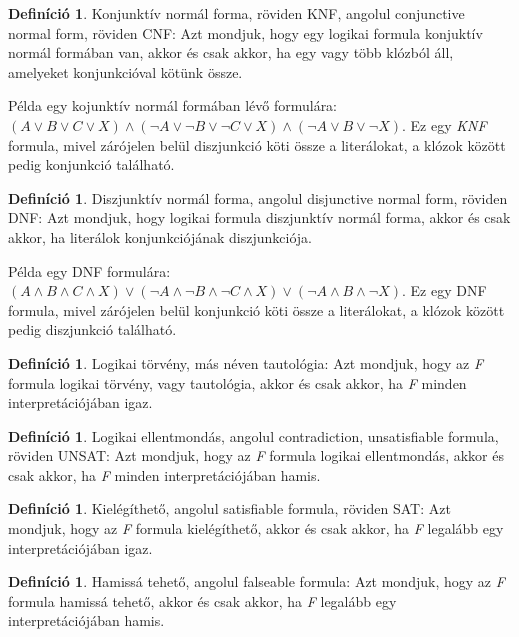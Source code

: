 \documentclass[
]{thesis-ekf}
\theoremstyle{definition}
\newtheorem{definicio}[tetel]{Definíció}
\theoremstyle{remark}
\begin{document}
\begin{definicio}\label{def-cnf}
	Konjunktív normál forma, röviden \textsc{KNF}, angolul conjunctive normal form, röviden \textsc{CNF}: Azt mondjuk, hogy egy logikai formula konjuktív normál formában van, akkor és csak akkor, ha egy vagy több klózból áll, amelyeket konjunkcióval kötünk össze.
\end{definicio}

	Példa egy kojunktív normál formában lévő formulára: $ (A \vee B \vee C \vee X) \wedge (\neg A \vee \neg B \vee \neg C \vee X) \wedge (\neg A \vee B \vee \neg X) $. Ez egy \emph{KNF} formula, mivel zárójelen belül diszjunkció köti össze a literálokat, a klózok között pedig konjunkció található.

\begin{definicio}\label{def-dnf}
	Diszjunktív normál forma, angolul disjunctive normal form, röviden \textsc{DNF}: Azt mondjuk, hogy logikai formula diszjunktív normál forma, akkor és csak akkor, ha literálok konjunkciójának diszjunkciója.
\end{definicio}


	Példa egy \textsc{DNF} formulára: $ (A \wedge B \wedge C \wedge X) \vee (\neg A \wedge \neg B \wedge \neg C \wedge X) \vee (\neg A \wedge B \wedge \neg X) $. Ez egy \textsc{DNF} formula, mivel zárójelen belül konjunkció köti össze a literálokat, a klózok között pedig diszjunkció található.


\begin{definicio}\label{def-tautologia}
	Logikai törvény, más néven tautológia: Azt mondjuk, hogy az \emph{F} formula logikai törvény, vagy tautológia, akkor és csak akkor, ha \emph{F} minden interpretációjában igaz.
\end{definicio}

\begin{definicio}
	Logikai ellentmondás, angolul contradiction, unsatisfiable formula, röviden \textsc{UNSAT}: Azt mondjuk, hogy az \emph{F} formula logikai ellentmondás, akkor és csak akkor, ha \emph{F} minden interpretációjában hamis.
\end{definicio}

\begin{definicio}
	Kielégíthető, angolul satisfiable formula, röviden \textsc{SAT}: Azt mondjuk, hogy az \emph{F} formula kielégíthető, akkor és csak akkor, ha \emph{F} legalább egy interpretációjában igaz.
\end{definicio}

\begin{definicio}
	Hamissá tehető, angolul falseable formula: Azt mondjuk, hogy az \emph{F} formula hamissá tehető, akkor és csak akkor, ha \emph{F} legalább egy interpretációjában hamis. 
\end{definicio}
\end{document}
